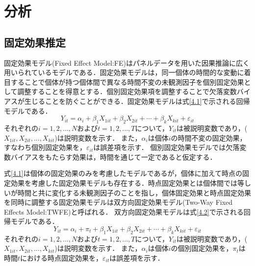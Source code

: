 \chapter{分析}

\section{固定効果推定}
固定効果モデル(Fixed Effect Model:FE)はパネルデータを用いた因果推論に広く用いられているモデルである．固定効果モデルは，同一個体の時間的な変動に着目することで個体が持つ個体間で異なる時間不変の未観測因子を個別固定効果として調整することを得意とする．個別固定効果項を調整することで欠落変数バイアスが生じることを防ぐことができる．固定効果モデルは式\ref{4.1}で示される回帰モデルである．
\begin{equation}
  Y_{it} = \alpha_{i} + \beta_{1}X_{1it} + \beta_{2}X_{2it} + \cdots  + \beta_{k}X_{kit} + \varepsilon_{it}
  \label{4.1}
\end{equation}
それぞれの$i=1,2,...,N$および$t=1,2,...,T$について，$Y_{it}$は被説明変数であり，($X_{1it},X_{2it},...,X_{kit}$)は説明変数を示す．
また，$\alpha_{i}$は個体$i$の時間不変の固定効果，すなわち個別固定効果を，$\varepsilon_{it}$は誤差項を示す．
個別固定効果モデルでは欠落変数バイアスをもたらす効果は，時間を通じて一定であると仮定する．

式\ref{4.1}は個体の固定効果のみを考慮したモデルであるが，個体に加えて時点の固定効果を考慮した固定効果モデルも存在する．時点固定効果とは個体間では等しいが時間と共に変化する未観測因子のことを指し，個体固定効果と時点固定効果を同時に調整する固定効果モデルは双方向固定効果モデル(Two-Way Fixed Effects Model:TWFE)と呼ばれる．
双方向固定効果モデルは式\ref{4.2}で示される回帰モデルである．
\begin{equation}
  Y_{it} = \alpha_{i} + \pi_{t} + \beta_{1}X_{1it} + \beta_{2}X_{2it} + \cdots  + \beta_{k}X_{kit} + \varepsilon_{it}
  \label{4.2}
\end{equation}
それぞれの$i=1,2,...,N$および$t=1,2,...,T$について，$Y_{it}$は被説明変数であり，($X_{1it},X_{2it},...,X_{kit}$)は説明変数を示す．
また，$\alpha_{i}$は個体$i$の個別固定効果を，$\pi_{t}$は時間$t$における時点固定効果を，$\varepsilon_{it}$は誤差項を示す．

